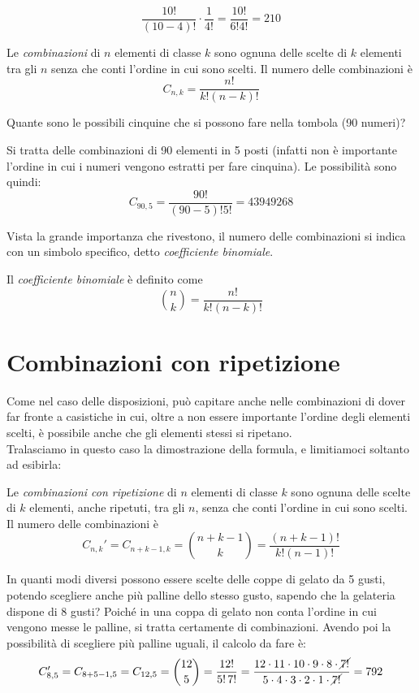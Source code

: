 $$\dfrac{10!}{(10-4)!}\cdot\dfrac{1}{4!}=\dfrac{10!}{6!4!}=210$$


\begin{definizione}
Le \emph{combinazioni} di $n$ elementi di classe $k$ sono ognuna delle scelte 
di $k$ elementi tra gli $n$ senza che conti l'ordine in cui sono scelti. Il 
numero delle combinazioni è
$$C_{n,k} =  \dfrac{n!}{k!(n-k)!}$$
\end{definizione}
\begin{esempio}
Quante sono le possibili cinquine che si possono fare nella tombola (90 numeri)?

Si tratta delle combinazioni di 90 elementi in 5 posti (infatti non è 
importante l'ordine in cui i numeri vengono estratti per fare cinquina). Le 
possibilità sono quindi:
$$C_{90,5} =  \dfrac{90!}{(90-5)!5!}=43 949 268$$
\end{esempio}

Vista la grande importanza che rivestono, il numero delle combinazioni si indica 
con un simbolo specifico, detto \emph{coefficiente binomiale}.

\begin{definizione}
Il \emph{coefficiente binomiale} è definito come 
$$ \binom{n}{k}=\dfrac{n!}{k!(n-k)!}$$
\end{definizione}

\section{Combinazioni con ripetizione}
\label{sec:04_combinazioni_con_ripetizione}

 Come nel caso delle disposizioni, può capitare anche nelle combinazioni di dover far fronte
 a casistiche in cui, oltre a non essere importante l'ordine degli elementi scelti, è possibile anche che
 gli elementi stessi si ripetano.
\\[4pt]
Tralasciamo in questo caso la dimostrazione della formula, e limitiamoci soltanto ad esibirla:

\begin{definizione}
Le \emph{combinazioni con ripetizione} di $n$ elementi di classe $k$ sono ognuna delle scelte 
di $k$ elementi, anche ripetuti, tra gli $n$, senza che conti l'ordine in cui sono scelti. Il 
numero delle combinazioni è
$$C_{n,k}' =  C_{n+k-1,k}= \binom{n+k-1}{k}=\dfrac{(n+k-1)!}{k!(n-1)!}$$
\end{definizione}

\begin{esempio}
 In quanti modi diversi possono essere scelte delle coppe di gelato da 5 gusti, potendo scegliere
 anche più palline dello stesso gusto, sapendo che la gelateria dispone di 8 gusti?
 Poiché in una coppa di gelato non conta l'ordine in
 cui vengono messe le palline, si tratta certamente di combinazioni. Avendo poi la possibilità
 di scegliere più palline uguali, il calcolo da fare è:
 \[C_{8,5}' = C_{8+5-1,5} = C_{12,5} = \binom{12}{5} = \frac{12!}{5!\, 7!} =
 \frac{12 \cdot 11 \cdot 10 \cdot 9 \cdot 8 \cdot \cancel{7!}}{5 \cdot 4 \cdot 3\cdot 2\cdot 1 \cdot \cancel{7!}}=792\]
\end{esempio}
